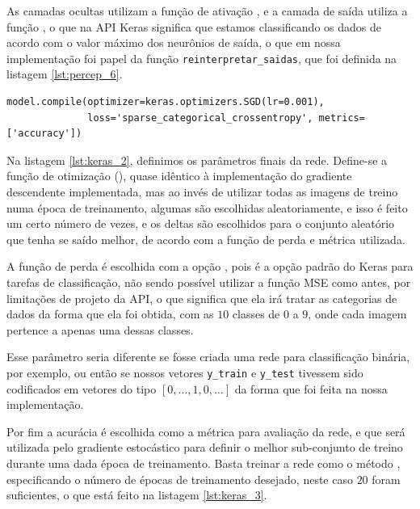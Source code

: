 As camadas ocultas utilizam a função de ativação , e a camada de saída utiliza a função , o que na API Keras significa que estamos classificando os dados de acordo com o valor máximo dos neurônios de saída, o que em nossa implementação foi papel da função \texttt{reinterpretar\_saidas}, que foi definida na listagem \ref{lst:percep_6}.

\begin{scriptsize}
\estiloR
\begin{lstlisting}[caption={Trecho do script \eng{mnist\_keras.py}},label={lst:keras_2},escapeinside={\%}]
model.compile(optimizer=keras.optimizers.SGD(lr=0.001),
              loss='sparse_categorical_crossentropy', metrics=['accuracy'])
\end{lstlisting}
\end{scriptsize}

Na listagem \ref{lst:keras_2}, definimos os parâmetros finais da rede. Define-se a função de otimização  (), quase idêntico à implementação do gradiente descendente implementada, mas ao invés de utilizar todas as imagens de treino numa época de treinamento, algumas são escolhidas aleatoriamente, e isso é feito um certo número de vezes, e os deltas são escolhidos para o conjunto aleatório que tenha se saído melhor, de acordo com a função de perda e métrica utilizada.

A função de perda é escolhida com a opção , pois é a opção padrão do Keras para tarefas de classificação, não sendo possível utilizar a função MSE como antes, por limitações de projeto da API, o que significa que ela irá tratar as categorias de dados da forma que ela foi obtida, com as $10$ classes de $0$ a $9$, onde cada imagem pertence a apenas uma dessas classes. 

Esse parâmetro seria diferente se fosse criada uma rede para classificação binária, por exemplo, ou então se nossos vetores \texttt{y\_train} e \texttt{y\_test} tivessem sido codificados em vetores do tipo $[0,\ldots,1,0,\ldots]$ da forma que foi feita na nossa implementação.

Por fim a acurácia é escolhida como a métrica para avaliação da rede, e que será utilizada pelo gradiente estocástico para definir o melhor sub-conjunto de treino durante uma dada época de treinamento. Basta treinar a rede como o método , especificando o número de épocas de treinamento desejado, neste caso $20$ foram suficientes, o que está feito na listagem \ref{lst:keras_3}.

